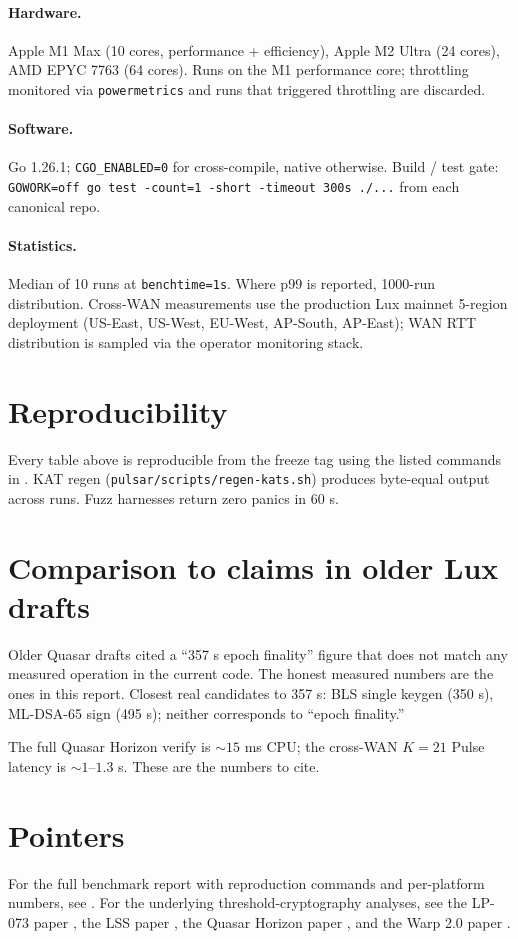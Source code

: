 \documentclass[11pt,a4paper]{article}
\begin{document}
\paragraph{Hardware.} Apple M1 Max (10 cores, performance + efficiency), Apple M2 Ultra (24 cores), AMD EPYC 7763 (64 cores). Runs on the M1 performance core; throttling monitored via \texttt{powermetrics} and runs that triggered throttling are discarded.

\paragraph{Software.} Go 1.26.1; \texttt{CGO\_ENABLED=0} for cross-compile, native otherwise. Build / test gate: \texttt{GOWORK=off go test -count=1 -short -timeout 300s ./...} from each canonical repo.

\paragraph{Statistics.} Median of 10 runs at \texttt{benchtime=1s}. Where p99 is reported, 1000-run distribution. Cross-WAN measurements use the production Lux mainnet 5-region deployment (US-East, US-West, EU-West, AP-South, AP-East); WAN RTT distribution is sampled via the operator monitoring stack.

\section{Reproducibility}

Every table above is reproducible from the freeze tag using the listed commands in \cite{luxbenchmarks}. KAT regen (\texttt{pulsar/scripts/regen-kats.sh}) produces byte-equal output across runs. Fuzz harnesses return zero panics in 60 s.

\section{Comparison to claims in older Lux drafts}

Older Quasar drafts cited a ``357 \textmu s epoch finality'' figure that does not match any measured operation in the current code. The honest measured numbers are the ones in this report. Closest real candidates to 357 \textmu s: BLS single keygen (350 \textmu s), ML-DSA-65 sign (495 \textmu s); neither corresponds to ``epoch finality.''

The full Quasar Horizon verify is $\sim 15$ ms CPU; the cross-WAN $K=21$ Pulse latency is $\sim 1$--$1.3$ s. These are the numbers to cite.

\section{Pointers}

For the full benchmark report with reproduction commands and per-platform numbers, see \cite{luxbenchmarks}. For the underlying threshold-cryptography analyses, see the LP-073 paper \cite{luxpulsar}, the LSS paper \cite{luxlssmpc}, the Quasar Horizon paper \cite{luxquasarhorizon}, and the Warp 2.0 paper \cite{luxwarpv2}.



\end{document}
